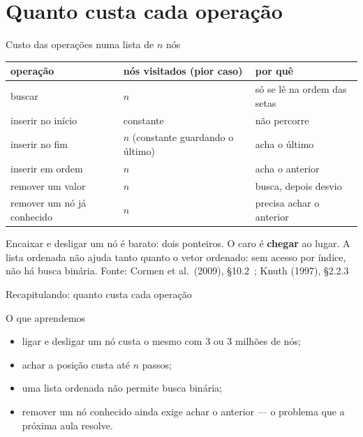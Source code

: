 \documentclass[aspectratio=169]{beamer}
\newcommand{\fonte}[1]{\vfill\hfill{\scriptsize\textcolor{UFSGray}{Fonte: #1}}}
\begin{document}
\section{Quanto custa cada operação}

\begin{frame}{Custo das operações numa lista de $n$ nós}
  \begin{center}
    \footnotesize
    \begin{tabular}{@{}lll@{}}
      \toprule
      operação & nós visitados (pior caso) & por quê\\
      \midrule
      buscar & $n$ & só se lê na ordem das setas\\
      inserir no início & constante & não percorre\\
      inserir no fim & $n$ (constante guardando o último) & acha o último\\
      inserir em ordem & $n$ & acha o anterior\\
      remover um valor & $n$ & busca, depois desvio\\
      remover um nó já conhecido & $n$ & precisa achar o anterior\\
      \bottomrule
    \end{tabular}
  \end{center}
  \small
  Encaixar e desligar um nó é barato: dois ponteiros. O caro é
  \textbf{chegar} ao lugar. A lista ordenada não ajuda tanto quanto o vetor
  ordenado: sem acesso por índice, não há busca binária.
  \fonte{Cormen et al.\ (2009), §10.2~\cite{cormen2009introduction};
    Knuth (1997), §2.2.3~\cite{knuth1997art}}
\end{frame}

\begin{frame}{Recapitulando: quanto custa cada operação}
  \begin{block}{O que aprendemos}
    \begin{itemize}
      \item ligar e desligar um nó custa o mesmo com 3 ou 3 milhões de nós;
      \item achar a posição custa até $n$ passos;
      \item uma lista ordenada não permite busca binária;
      \item remover um nó conhecido ainda exige achar o anterior --- o
        problema que a próxima aula resolve.
    \end{itemize}
  \end{block}
\end{frame}
\end{document}
